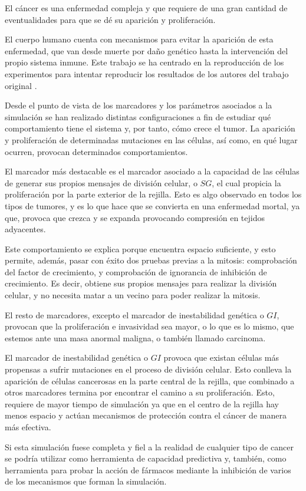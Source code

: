 El cáncer es una enfermedad compleja y que requiere de una gran cantidad
de eventualidades para que se dé su aparición y proliferación.

El cuerpo humano cuenta con mecanismos para evitar la aparición de esta enfermedad,
que van desde muerte por daño genético hasta la intervención del propio sistema inmune.
Este trabajo se ha centrado en la reproducción de los experimentos para intentar reproducir
los resultados de los autores del trabajo original \cite{jsantos-amonteagudo-1-2014}.

Desde el punto de vista de los marcadores y los parámetros asociados a la simulación se
han realizado distintas configuraciones a fin de estudiar qué comportamiento tiene el sistema y, por tanto,
cómo crece el tumor. La aparición y proliferación de determinadas mutaciones en las células, así como, en qué lugar ocurren,
provocan determinados comportamientos.

El marcador más destacable es el marcador asociado a la capacidad de las células de generar sus propios mensajes de división celular,
o $SG$, el cual propicia la proliferación por la parte exterior de la rejilla.
Esto es algo observado en todos los tipos de tumores, y es lo que hace que se convierta en una
enfermedad mortal, ya que, provoca que crezca y se expanda provocando compresión en tejidos
adyacentes.

Este comportamiento se explica porque encuentra espacio suficiente, y esto permite, además, pasar con éxito dos pruebas previas a la mitosis:
comprobación del factor de crecimiento, y comprobación de ignorancia de inhibición de crecimiento.
Es decir, obtiene sus propios mensajes para realizar la división celular, y no necesita
matar a un vecino para poder realizar la mitosis.

El resto de marcadores, excepto el marcador de inestabilidad genética o $GI$, provocan
que la proliferación e invasividad sea mayor, o lo que es lo mismo, que estemos ante una
masa anormal maligna, o también llamado carcinoma.

El marcador de inestabilidad genética o $GI$ provoca que existan células más propensas
a sufrir mutaciones en el proceso de división celular. Esto conlleva la aparición
de células cancerosas en la parte central de la rejilla, que combinado a otros marcadores
termina por encontrar el camino a su proliferación. Esto, requiere de mayor tiempo de simulación
ya que en el centro de la rejilla hay menos espacio y actúan mecanismos de protección contra
el cáncer de manera más efectiva.

Si esta simulación fuese completa y fiel a la realidad de cualquier tipo de cancer se
podría utilizar como herramienta de capacidad predictiva y, también, como herramienta
para probar la acción de fármacos mediante la inhibición de varios de los mecanismos
que forman la simulación.
